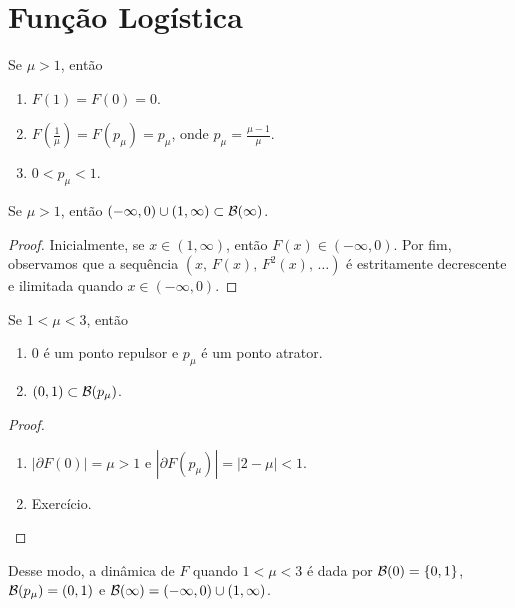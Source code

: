 \section{Função Logística}

\begin{proposition}
Se $\mu > 1$, então
\begin{enumerate}
\item $F(1) = F(0) = 0$.
\item $F \left( \frac{1}{\mu} \right) = F(p_\mu) = p_\mu$, onde $p_\mu = \frac{\mu-1}{\mu}$.
\item $0 < p_\mu < 1$.
\end{enumerate}
\end{proposition}

\begin{proposition} \label{prop 2-1}
Se $\mu > 1$, então $(-\infty, 0) \cup (1, \infty) \subset \mathcal{B}(\infty)$.
\end{proposition}

\begin{proof}
Inicialmente, se $x \in (1, \infty)$, então $F(x) \in (-\infty, 0)$. Por fim, observamos que a sequência  $(x,\, F(x),\, F^2(x),\, \dots)$ é estritamente decrescente e ilimitada quando $x \in (-\infty, 0)$.
\end{proof}

\begin{proposition}
Se $1 < \mu < 3$, então
\begin{enumerate}
\item $0$ é um ponto repulsor e $p_\mu$ é um ponto atrator.
\item $(0, 1) \subset \mathcal{B}(p_\mu)$.
\end{enumerate}
\end{proposition}

\begin{proof}
\begin{enumerate}
\item $|\partial F(0)| = \mu > 1$ e $|\partial F(p_\mu)| = |2 - \mu| < 1$.
\item Exercício.
\end{enumerate}
\end{proof}

Desse modo, a dinâmica de $F$ quando $1 < \mu < 3$ é dada por $\mathcal{B}(0) = \{0, 1\}$, $\mathcal{B}(p_\mu) = (0, 1)$ e $\mathcal{B}(\infty) = (-\infty, 0) \cup (1, \infty)$.